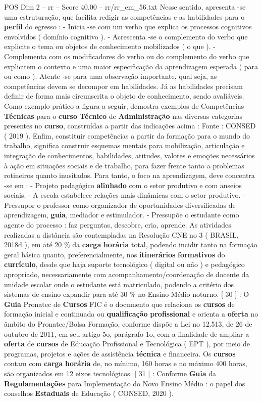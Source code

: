 \begin{textsample}{POS Dim 2 – rr – Score 40.00 – rr/rr\_em\_56.txt}
Nesse sentido, apresenta -se uma estruturação, que facilita redigir as competências e as habilidades para o \textbf{perfil} do egresso : - Inicia -se com um verbo que explica os processos cognitivos envolvidos ( domínio cognitivo ). - Acrescenta -se o complemento do verbo que explicite o tema ou objetos de conhecimento mobilizados ( o que ). - Complementa com os modificadores do verbo ou do complemento do verbo que explicitem o contexto e uma maior especificação da aprendizagem esperada ( para ou como ).
Atente -se para uma observação importante, qual seja, as competências devem se decompor em habilidades.
Já as habilidades precisam definir de forma mais circunscrita o objeto de conhecimento, sendo avaliáveis.
Como exemplo prático a figura a seguir, demostra exemplos de Competências \textbf{Técnicas} para o \textbf{curso} \textbf{Técnico} de \textbf{Administração} nas diversas categorias presentes no \textbf{curso}, construídas a partir das indicações acima : Fonte : CONSED ( 2019 ).
Enfim, constituir competências a partir da formação para o mundo do trabalho, significa construir esquemas mentais para mobilização, articulação e integração de conhecimentos, habilidades, atitudes, valores e emoções necessários à ação em situações sociais e de trabalho, para fazer frente tanto a problemas rotineiros quanto inusitados.
Para tanto, o foco na aprendizagem, deve concentra -se em : - Projeto pedagógico \textbf{alinhado} com o setor produtivo e com anseios sociais. - A escola estabelece relações mais dinâmicas com o setor produtivo. - Pressupor o professor como organizador de oportunidades diversificadas de aprendizagem, \textbf{guia}, mediador e estimulador. - Pressupõe o estudante como agente do processo : faz perguntas, descobre, cria, aprende.
As atividades realizadas a distância são contempladas na Resolução CNE no 3 ( BRASIL, 2018d ), em até 20 \% da \textbf{carga} \textbf{horária} total, podendo incidir tanto na formação geral básica quanto, preferencialmente, nos \textbf{itinerários} \textbf{formativos} do \textbf{currículo}, desde que haja suporte tecnológico ( digital ou não ) e pedagógico apropriado, necessariamente com acompanhamento/coordenação de docente da unidade escolar onde o estudante está matriculado, podendo a critério dos sistemas de ensino expandir para até 30 \% no Ensino Médio noturno. [ 30 ] : O \textbf{Guia} Pronatec de \textbf{Cursos} FIC é o documento que relaciona os \textbf{cursos} de formação inicial e continuada ou \textbf{qualificação} \textbf{profissional} e orienta a \textbf{oferta} no âmbito do Pronatec/Bolsa Formação, conforme dispõe a Lei no 12.513, de 26 de outubro de 2011, em seu artigo 5o, parágrafo 1o, com a finalidade de ampliar a \textbf{oferta} de \textbf{cursos} de Educação Profissional e Tecnológica ( EPT ), por meio de programas, projetos e ações de assistência \textbf{técnica} e financeira.
Os \textbf{cursos} contam com \textbf{carga} \textbf{horária} de, no mínimo, 160 horas e no máximo 400 horas, são organizados em 12 eixos tecnológicos. [ 31 ] : Conforme \textbf{Guia} da \textbf{Regulamentações} para Implementação do Novo Ensino Médio : o papel dos conselhos \textbf{Estaduais} de Educação ( CONSED, 2020 ).


\end{textsample}
